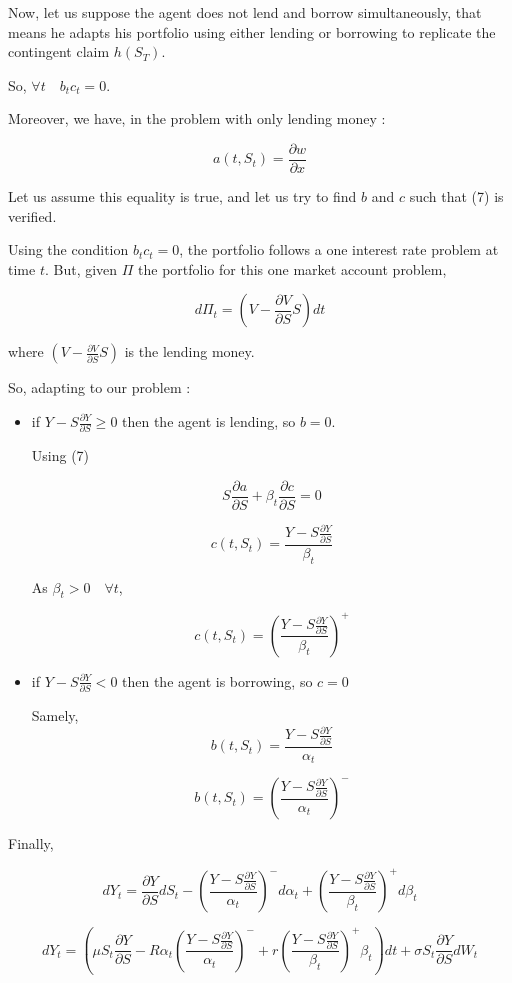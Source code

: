\documentclass[english,a4paper,12pt,titlepage]{book}
\begin{document}
Now, let us suppose the agent does not lend and borrow simultaneously, that means he adapts his portfolio using either lending or borrowing to replicate the contingent claim $h(S_T)$. 

So, $\forall t \quad b_t c_t=0$. 

Moreover, we have, in the problem with only lending money : 

\[a(t,S_t)= \frac{\partial w}{\partial x} \]

Let us assume this equality is true, and let us try to find $b$ and $c$ such that (7) is verified. 

Using the condition $b_t c_t=0$, the portfolio follows a one interest rate problem at time $t$. 
But, given $\Pi$ the portfolio for this one market account problem, 

\[d\Pi_t=(V-\frac{\partial V}{\partial S}S)dt\]

where $(V-\frac{\partial V}{\partial S}S)$ is the lending money. 

So, adapting to our problem : 

\begin{itemize}
	\item if $Y-S\frac{\partial Y}{\partial S} \geq 0$ then the agent is lending, so $b=0$. 
	
	Using (7)
	
	
	\[S\frac{\partial a}{\partial S} + \beta_t \frac{\partial c}{\partial S}   = 0\]
	
	\[c(t,S_t)=\frac{Y-S\frac{\partial Y}{\partial S}}{\beta_t}\]
	
	As $\beta_t > 0 \quad \forall t$, 
	
	\[c(t,S_t)=(\frac{Y-S\frac{\partial Y}{\partial S}}{\beta_t})^+\]
	
	\item if $Y-S\frac{\partial Y}{\partial S} < 0$ then the agent is borrowing, so $c=0$
	
	Samely, 
	\[b(t,S_t)=\frac{Y-S\frac{\partial Y}{\partial S}}{\alpha_t}\]
	
	\[b(t,S_t)=(\frac{Y-S\frac{\partial Y}{\partial S}}{\alpha_t})^-\]
	
\end{itemize}

Finally, 

\[dY_t= \frac{\partial Y}{\partial S}dS_t - (\frac{Y-S\frac{\partial Y}{\partial S}}{\alpha_t})^-d\alpha_t + (\frac{Y-S\frac{\partial Y}{\partial S}}{\beta_t})^+d\beta_t \]

\[dY_t= (\mu S_t \frac{\partial Y}{\partial S} - R\alpha_t(\frac{Y-S\frac{\partial Y}{\partial S}}{\alpha_t})^- + r(\frac{Y-S\frac{\partial Y}{\partial S}}{\beta_t})^+\beta_t)dt + \sigma S_t \frac{\partial Y}{\partial S}dW_t   \]
\end{document}
